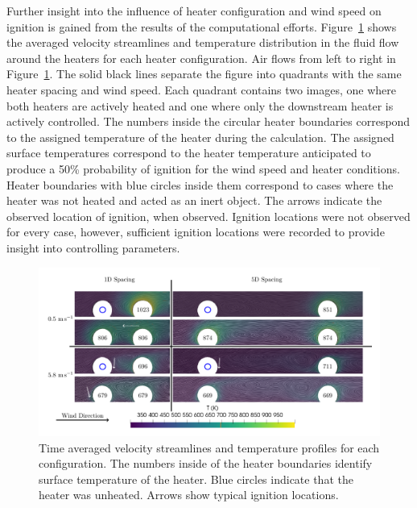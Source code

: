    Further insight into the influence of heater configuration and wind speed on ignition is gained from the results of the computational efforts. Figure~\ref{fig:multiHeaterCFD} shows the averaged velocity streamlines and temperature distribution in the fluid flow around the heaters for each heater configuration. Air flows from left to right in Figure~\ref{fig:multiHeaterCFD}. The solid black lines separate the figure into quadrants with the same heater spacing and wind speed. Each quadrant contains two images, one where both heaters are actively heated and one where only the downstream heater is actively controlled. The numbers inside the circular heater boundaries correspond to the assigned temperature of the heater during the calculation. The assigned surface temperatures correspond to the heater temperature anticipated to produce a 50\% probability of ignition for the wind speed and heater conditions. Heater boundaries with blue circles inside them correspond to cases where the heater was not heated and acted as an inert object. The arrows indicate the observed location of ignition, when observed. Ignition locations were not observed for every case, however, sufficient ignition locations were recorded to provide insight into controlling parameters.
        \begin{figure}
            \centering
            \includegraphics[width=\columnwidth]{Figures/quarter_circle.pdf}
            \caption{Time averaged velocity streamlines and temperature profiles for each configuration. The numbers inside of the heater boundaries identify surface temperature of the heater. Blue circles indicate that the heater was unheated. Arrows show typical ignition locations.}
            \label{fig:multiHeaterCFD}
        \end{figure}
